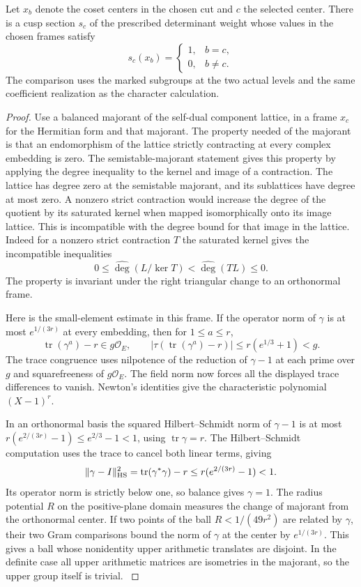 \begin{lemma}
\label{lem:separating-level-section}
Let \(x_b\) denote the coset centers in the chosen cut and \(c\) the selected center. There is a cusp section \(s_c\) of the prescribed determinant weight whose values in the chosen frames satisfy
\[
 s_c(x_b)=\begin{cases}1,&b=c,\\0,&b\ne c.\end{cases}
\]
 The comparison uses the marked subgroups at the two
actual levels and the same coefficient realization as the
character calculation.
\end{lemma}

\begin{proof}
Use a balanced majorant of the self-dual component lattice, in a
frame $x_c$ for the Hermitian form and that majorant. The property
needed of the majorant is that an endomorphism of the lattice
strictly contracting at every complex embedding is zero. The
semistable-majorant statement gives this property by applying the
degree inequality to the kernel and image of a contraction. The lattice has degree zero at the semistable majorant, and its
sublattices have degree at most zero. A nonzero strict contraction
would increase the degree of the quotient by its saturated kernel
when mapped isomorphically onto its image lattice. This is
incompatible with the degree bound for that image in the lattice.
Indeed for a nonzero strict contraction \(T\) the saturated kernel gives the incompatible inequalities
\[
  0\le\widehat{\deg}(L/\ker T)<\widehat{\deg}(T L)\le0 .
\]
 The property is invariant under the
right triangular change to an orthonormal frame.

Here is the small-element estimate in this frame. If the operator
norm of $\gamma$ is at most $e^{1/(3r)}$ at every embedding, then
for $1\le a\le r$,
\[
 \operatorname{tr}(\gamma^a)-r\in g\mathcal O_E,
 \qquad |\tau(\operatorname{tr}(\gamma^a)-r)|
       \le r(e^{1/3}+1)<g .
\]
The trace congruence uses nilpotence of the reduction of $\gamma-1$
at each prime over $g$ and squarefreeness of $g\mathcal O_E$. The
field norm now forces all the displayed trace differences to vanish.
Newton's identities give the characteristic polynomial $(X-1)^r$.

In an orthonormal basis the squared Hilbert--Schmidt norm of
$\gamma-1$ is at most $r(e^{2/(3r)}-1)\le e^{2/3}-1<1$, using
$\operatorname{tr}\gamma=r$.
The Hilbert--Schmidt computation uses the trace to cancel both linear terms, giving
\[
  \|\gamma-I\|_{\rm HS}^2=\operatorname{tr}(\gamma^*\gamma)-r\le r(e^{2/(3r)}-1)<1 .
\]
 Its operator norm is strictly below
one, so balance gives $\gamma=1$. The radius potential $R$ on
the positive-plane domain measures the change of majorant from the
orthonormal center. If two points of the ball $R<1/(49r^2)$ are
related by $\gamma$, their two Gram comparisons bound the norm
of $\gamma$ at the center by $e^{1/(3r)}$. This gives a ball whose
nonidentity upper arithmetic translates are disjoint. In the
definite case all upper arithmetic matrices are isometries in the
majorant, so the upper group itself is trivial.
\label{cor:paired-cusp-ranks-3}


\end{proof}
